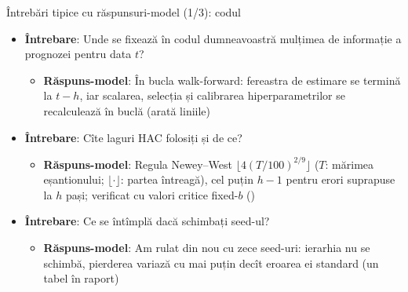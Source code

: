 \begin{frame}{Întrebări tipice cu răspunsuri-model (1/3): codul}
\itemsize{\footnotesize}
\begin{itemize}
    \item \textbf{Întrebare}: Unde se fixează în codul dumneavoastră mulțimea de informație a prognozei pentru data $t$?
    \begin{itemize}
        \item \textbf{Răspuns-model}: În bucla walk-forward: fereastra de estimare se termină la $t - h$, iar scalarea, selecția și calibrarea hiperparametrilor se recalculează în buclă (arată liniile)
    \end{itemize}
    \item \textbf{Întrebare}: Cîte laguri HAC folosiți și de ce?
    \begin{itemize}
        \item \textbf{Răspuns-model}: Regula Newey--West $\lfloor 4(T/100)^{2/9}\rfloor$ ($T$: mărimea eșantionului; $\lfloor\cdot\rfloor$: partea întreagă), cel puțin $h - 1$ pentru erori suprapuse la $h$ pași; verificat cu valori critice fixed-$b$ ()
    \end{itemize}
    \item \textbf{Întrebare}: Ce se întîmplă dacă schimbați seed-ul?
    \begin{itemize}
        \item \textbf{Răspuns-model}: Am rulat din nou cu zece seed-uri: ierarhia nu se schimbă, pierderea variază cu mai puțin decît eroarea ei standard (un tabel în raport)
    \end{itemize}
\end{itemize}
\end{frame}

